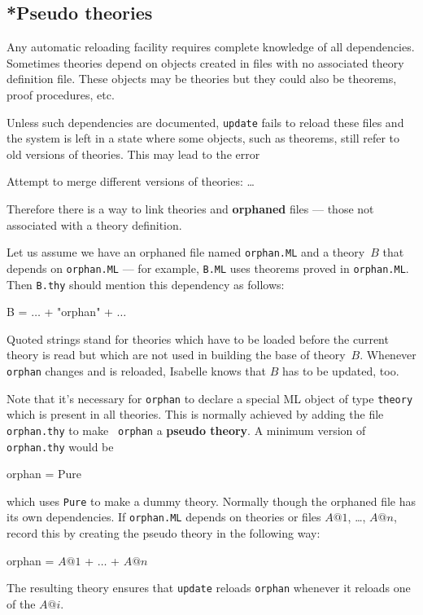 \subsection{*Pseudo theories}\label{sec:pseudo-theories}
%
Any automatic reloading facility requires complete knowledge of all
dependencies.  Sometimes theories depend on objects created in \ML{} files
with no associated theory definition file.  These objects may be theories but
they could also be theorems, proof procedures, etc.

Unless such dependencies are documented, {\tt update} fails to reload these
\ML{} files and the system is left in a state where some objects, such as
theorems, still refer to old versions of theories.  This may lead to the
error
\begin{ttbox}
Attempt to merge different versions of theories: \dots
\end{ttbox}
Therefore there is a way to link theories and {\bf orphaned} \ML{} files ---
those not associated with a theory definition.

Let us assume we have an orphaned \ML{} file named {\tt orphan.ML} and a
theory~$B$ that depends on {\tt orphan.ML} --- for example, {\tt B.ML} uses
theorems proved in {\tt orphan.ML}.  Then {\tt B.thy} should
mention this dependency as follows:
\begin{ttbox}
B = \(\ldots\) + "orphan" + \(\ldots\)
\end{ttbox}
Quoted strings stand for theories which have to be loaded before the
current theory is read but which are not used in building the base of
theory~$B$. Whenever {\tt orphan} changes and is reloaded, Isabelle
knows that $B$ has to be updated, too.

Note that it's necessary for {\tt orphan} to declare a special ML
object of type {\tt theory} which is present in all theories. This is
normally achieved by adding the file {\tt orphan.thy} to make {\tt
orphan} a {\bf pseudo theory}. A minimum version of {\tt orphan.thy}
would be

\begin{ttbox}
orphan = Pure
\end{ttbox}

which uses {\tt Pure} to make a dummy theory. Normally though the
orphaned file has its own dependencies.  If {\tt orphan.ML} depends on
theories or files $A@1$, \ldots, $A@n$, record this by creating the
pseudo theory in the following way:
\begin{ttbox}
orphan = \(A@1\) + \(\ldots\) + \(A@n\)
\end{ttbox}
The resulting theory ensures that {\tt update} reloads {\tt orphan}
whenever it reloads one of the $A@i$.

